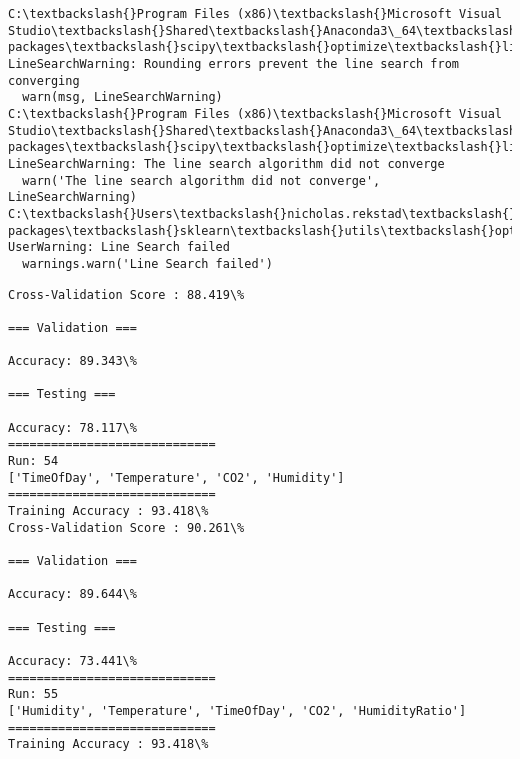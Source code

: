 \documentclass[11pt]{article}
\begin{document}
    \begin{Verbatim}[commandchars=\\\{\}]
C:\textbackslash{}Program Files (x86)\textbackslash{}Microsoft Visual Studio\textbackslash{}Shared\textbackslash{}Anaconda3\_64\textbackslash{}lib\textbackslash{}site-packages\textbackslash{}scipy\textbackslash{}optimize\textbackslash{}linesearch.py:422: LineSearchWarning: Rounding errors prevent the line search from converging
  warn(msg, LineSearchWarning)
C:\textbackslash{}Program Files (x86)\textbackslash{}Microsoft Visual Studio\textbackslash{}Shared\textbackslash{}Anaconda3\_64\textbackslash{}lib\textbackslash{}site-packages\textbackslash{}scipy\textbackslash{}optimize\textbackslash{}linesearch.py:313: LineSearchWarning: The line search algorithm did not converge
  warn('The line search algorithm did not converge', LineSearchWarning)
C:\textbackslash{}Users\textbackslash{}nicholas.rekstad\textbackslash{}AppData\textbackslash{}Roaming\textbackslash{}Python\textbackslash{}Python36\textbackslash{}site-packages\textbackslash{}sklearn\textbackslash{}utils\textbackslash{}optimize.py:195: UserWarning: Line Search failed
  warnings.warn('Line Search failed')

    \end{Verbatim}

    \begin{Verbatim}[commandchars=\\\{\}]
Cross-Validation Score : 88.419\%

=== Validation ===

Accuracy: 89.343\%

=== Testing ===

Accuracy: 78.117\%
=============================
Run: 54
['TimeOfDay', 'Temperature', 'CO2', 'Humidity']
=============================
Training Accuracy : 93.418\%
Cross-Validation Score : 90.261\%

=== Validation ===

Accuracy: 89.644\%

=== Testing ===

Accuracy: 73.441\%
=============================
Run: 55
['Humidity', 'Temperature', 'TimeOfDay', 'CO2', 'HumidityRatio']
=============================
Training Accuracy : 93.418\%

    \end{Verbatim}
\end{document}
